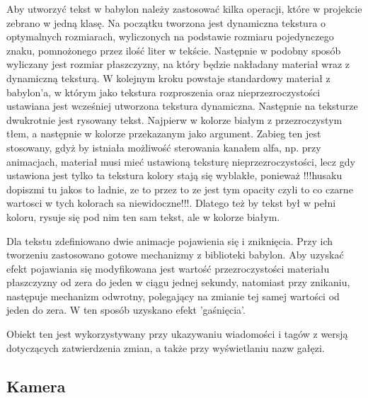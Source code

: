 \documentclass[11pt,a4paper,polish,thesis]{dcsbook}
\begin{document}
	Aby utworzyć tekst w babylon należy zastosować kilka operacji, które w projekcie zebrano w jedną klasę. Na początku tworzona jest dynamiczna tekstura o optymalnych rozmiarach, wyliczonych na podstawie rozmiaru pojedynczego znaku, pomnożonego przez ilość liter w tekście. Następnie w podobny sposób wyliczany jest rozmiar płaszczyzny, na który będzie nakładany materiał wraz z dynamiczną teksturą. W kolejnym kroku powstaje standardowy materiał z babylon'a, w którym jako tekstura rozproszenia oraz nieprzezroczystości ustawiana jest wcześniej utworzona tekstura dynamiczna. Następnie na teksturze dwukrotnie jest rysowany tekst. Najpierw w kolorze białym z przezroczystym tłem, a następnie w kolorze przekazanym jako argument. Zabieg ten jest stosowany, gdyż by istniała możliwość sterowania kanałem alfa, np. przy animacjach, materiał musi mieć ustawioną teksturę nieprzezroczystości, lecz gdy ustawiona jest tylko ta tekstura kolory stają się wyblakłe, ponieważ !!!husaku dopiszmi tu jakos to ładnie, ze to przez to ze jest tym opacity czyli to co czarne wartosci w tych kolorach sa niewidoczne!!!.
	Dlatego też by tekst był w pełni koloru, rysuje się pod nim ten sam tekst, ale w kolorze białym.
	
	Dla tekstu zdefiniowano dwie animacje pojawienia się i zniknięcia. Przy ich tworzeniu zastosowano gotowe mechanizmy z biblioteki babylon. Aby uzyskać efekt pojawiania się modyfikowana jest wartość przezroczystości materiału płaszczyzny od zera do jeden w ciągu jednej sekundy, natomiast przy znikaniu, następuje mechanizm odwrotny, polegający na zmianie tej samej wartości od jeden do zera. W ten sposób uzyskano efekt 'gaśnięcia'.
	
	Obiekt ten jest wykorzystywany przy ukazywaniu wiadomości i tagów z wersją dotyczących zatwierdzenia zmian, a także przy wyświetlaniu nazw gałęzi.

	

	\subsection{Kamera}
	
\end{document}
